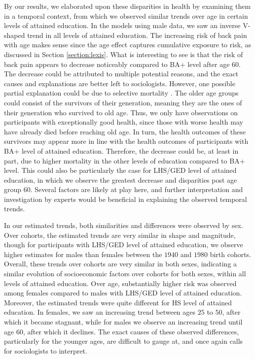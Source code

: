 \vspace{-0.2cm}
By our results, we elaborated upon these disparities in health by examining them in a temporal context, from which we observed similar trends over age in certain levels of attained education. In the models using male data, we saw an inverse V-shaped trend in all levels of attained education. The increasing risk of back pain with age makes sense since the age effect captures cumulative exposure to risk, as discussed in Section \ref{section:lexis}. What is interesting to see is that the risk of back pain appears to decrease noticeably compared to BA+ level after age $60$. The decrease could be attributed to multiple potential reasons, and the exact causes and explanations are better left to sociologists. However, one possible partial explanation could be due to selective mortality \citep{beckett2000converging, house1990age, lynch2003cohort}. The older age groups could consist of the survivors of their generation, meaning they are the ones of their generation who survived to old age. Thus, we only have observations on participants with exceptionally good health, since those with worse health may have already died before reaching old age. In turn, the health outcomes of these survivors may appear more in line with the health outcomes of participants with BA+ level of attained education. Therefore, the decrease could be, at least in part, due to higher mortality in the other levels of education compared to BA+ level. This could also be particularly the case for LHS/GED level of attained education, in which we observe the greatest decrease and disparities post age group $60$. Several factors are likely at play here, and further interpretation and investigation by experts would be beneficial in explaining the observed temporal trends.

\vspace{-0.2cm}
In our estimated trends, both similarities and differences were observed by sex. Over cohorts, the estimated trends are very similar in shape and magnitude, though for participants with LHS/GED level of attained education, we observe higher estimates for males than females between the $1940$ and $1980$ birth cohorts. Overall, these trends over cohorts are very similar in both sexes, indicating a similar evolution of socioeconomic factors over cohorts for both sexes, within all levels of attained education. Over age, substantially higher risk was observed among females compared to males with LHS/GED level of attained education. Moreover, the estimated trends were quite different for HS level of attained education. In females, we saw an increasing trend between ages $25$ to $50$, after which it became stagnant, while for males we observe an increasing trend until age $60$, after which it declines. The exact causes of these observed differences, particularly for the younger ages, are difficult to gauge at, and once again calls for sociologists to interpret.

